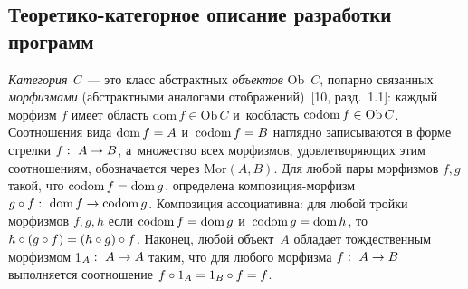 \begin{multicols}{2}
\section{Теоретико-категорное описание разработки программ}

 \textit{Категория C}~--- это класс абстрактных \textit{объектов} Ob~$C$,
попарно связанных \textit{морфизмами} (аб\-ст\-ракт\-ны\-ми аналогами
отображений)~[10, разд.~1.1]: каждый морфизм $f$ имеет область
$\mathrm{dom}\, f \in \mathrm{Ob}\, C$ и~кообласть
$\mathrm{codom}\, f \hm\in \mathrm{Ob}\, C$.
Соотношения вида $\mathrm{dom}\, f\hm = A$ и~$\mathrm{codom}\, f \hm= B$
наглядно записываются в форме стрелки $f:\ A\hm\to B$, а~множество всех
морфизмов, удовлетворяющих этим соотношениям, обозначается через
$\mathrm{Mor}(A, B)$. Для любой пары морфизмов $f, g$ такой, что
$\mathrm{codom}\, f \hm= \mathrm{dom}\, g$, определена
ком\-по\-зи\-ция-мор\-физм $g\circ f:\ \mathrm{dom}\, f \hm\to \mathrm{codom}\,g$.
Композиция ассоциативна: для любой тройки морфизмов $f, g, h$ если
$\mathrm{codom}\, f \hm= \mathrm{dom}\, g$ и~$\mathrm{codom}\, g \hm= \mathrm{dom}\, h$,
то $h\circ (g \circ f) \hm= (h \circ g) \circ f$. Наконец, любой
объект~$A$ обладает тождественным морфизмом 1$_A:\ A\hm\to A$ таким, что
для любого морфизма $f:\ A\hm\to B$ выполняется соотношение
$f \circ 1_A \hm= 1_B\circ f \hm= f$.


\end{multicols}
